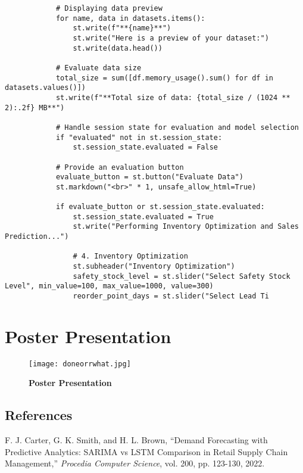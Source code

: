 \documentclass[10pt]{report}
\begin{document}
\begin{center}
\begin{lstlisting}
            # Displaying data preview
            for name, data in datasets.items():
                st.write(f"**{name}**")
                st.write("Here is a preview of your dataset:")
                st.write(data.head())

            # Evaluate data size
            total_size = sum([df.memory_usage().sum() for df in datasets.values()])
            st.write(f"**Total size of data: {total_size / (1024 ** 2):.2f} MB**")

            # Handle session state for evaluation and model selection
            if "evaluated" not in st.session_state:
                st.session_state.evaluated = False
            
            # Provide an evaluation button
            evaluate_button = st.button("Evaluate Data")
            st.markdown("<br>" * 1, unsafe_allow_html=True)

            if evaluate_button or st.session_state.evaluated:
                st.session_state.evaluated = True
                st.write("Performing Inventory Optimization and Sales Prediction...")
                        
                # 4. Inventory Optimization
                st.subheader("Inventory Optimization")
                safety_stock_level = st.slider("Select Safety Stock Level", min_value=100, max_value=1000, value=300)
                reorder_point_days = st.slider("Select Lead Ti

\end{lstlisting}
\newpage
\section{Poster Presentation}
\begin{figure}[H]
 \centering
 \texttt{[image: doneorrwhat.jpg]}
 \caption{\textbf{Poster Presentation}}
\end{figure}

\begin{thebibliography}{99}
\section{References}
    F. J. Carter, G. K. Smith, and H. L. Brown, “Demand Forecasting with Predictive Analytics: SARIMA vs LSTM Comparison in Retail Supply Chain Management,” \textit{Procedia Computer Science}, vol. 200, pp. 123-130, 2022.


\end{thebibliography}
\end{center}
\end{document}
